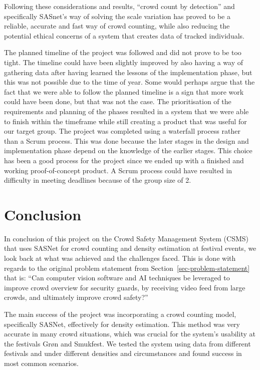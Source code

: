 \documentclass[
]{article}
\begin{document}
Following these considerations and results, ``crowd count by detection''
and specifically SASnet's way of solving the scale variation has proved
to be a reliable, accurate and fast way of crowd counting, while also
reducing the potential ethical concerns of a system that creates data of
tracked individuals.

The planned timeline of the project was followed and did not prove to be
too tight. The timeline could have been slightly improved by also having
a way of gathering data after having learned the lessons of the
implementation phase, but this was not possible due to the time of year.
Some would perhaps argue that the fact that we were able to follow the
planned timeline is a sign that more work could have been done, but that
was not the case. The prioritisation of the requirements and planning of
the phases resulted in a system that we were able to finish within the
timeframe while still creating a product that was useful for our target
group. The project was completed using a waterfall process rather than a
Scrum process. This was done because the later stages in the design and
implementation phase depend on the knowledge of the earlier stages. This
choice has been a good process for the project since we ended up with a
finished and working proof-of-concept product. A Scrum process could
have resulted in difficulty in meeting deadlines because of the group
size of 2.

\newpage{}

\hypertarget{sec-conclusion}{%
\section{Conclusion}\label{sec-conclusion}}

In conclusion of this project on the Crowd Safety Management System
(CSMS) that uses SASNet for crowd counting and density estimation at
festival events, we look back at what was achieved and the challenges
faced. This is done with regards to the original problem statement from
Section~\ref{sec-problem-statement} that is: ``Can computer vision
software and AI techniques be leveraged to improve crowd overview for
security guards, by receiving video feed from large crowds, and
ultimately improve crowd safety?''

The main success of the project was incorporating a crowd counting
model, specifically SASNet, effectively for density estimation. This
method was very accurate in many crowd situations, which was crucial for
the system's usability at the festivals Grøn and Smukfest. We tested the
system using data from different festivals and under different densities
and circumstances and found success in most common scenarios.
\end{document}
